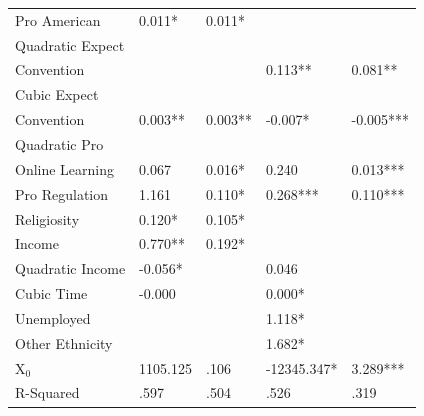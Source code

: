\documentclass[AER]{./aea-latex-templates/AEA}
\begin{document}
\begin{table}
\begin{tabular}{lllll}
            \\Pro American & 0.011* & 0.011* \\ %
            Quadratic Expect
            \\Convention &  &  & 0.113** & 0.081** \\ %
            Cubic Expect
            \\Convention & 0.003** & 0.003** & -0.007* & -0.005*** \\ %
            Quadratic Pro
            \\Online Learning & 0.067 & 0.016* & 0.240 & 0.013*** \\ %
            Pro Regulation & 1.161 & 0.110* & 0.268*** & 0.110*** \\ %
            Religiosity & 0.120* & 0.105* \\ %
            Income & 0.770** & 0.192* \\ %
            Quadratic Income & -0.056* &  & 0.046 &  \\ %
            Cubic Time & -0.000 &  & 0.000* &  \\ %
            Unemployed &  &  & 1.118* &  \\ %
            Other Ethnicity &  &  & 1.682* & \\ %
            X$_0$ & 1105.125 & .106 & -12345.347* & 3.289*** \\
            R-Squared & .597 & .504 & .526 & .319 %
        

\end{tabular}
\end{table}
\end{document}
